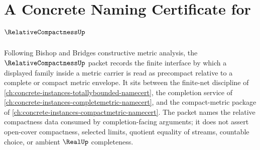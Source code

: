 \chapter{A Concrete Naming Certificate for $\RelativeCompactnessUp$}
\label{ch:concrete-instances-relative-compactness-namecert}

Following Bishop and Bridges constructive metric analysis, the $\RelativeCompactnessUp$ packet records the finite interface by which a displayed family inside a metric carrier is read as precompact relative to a complete or compact metric envelope. It sits between the finite-net discipline of \autoref{ch:concrete-instances-totallybounded-namecert}, the completion service of \autoref{ch:concrete-instances-completemetric-namecert}, and the compact-metric package of \autoref{ch:concrete-instances-compactmetric-namecert}. The packet names the relative compactness data consumed by completion-facing arguments; it does not assert open-cover compactness, selected limits, quotient equality of streams, countable choice, or ambient $\RealUp$ completeness.

